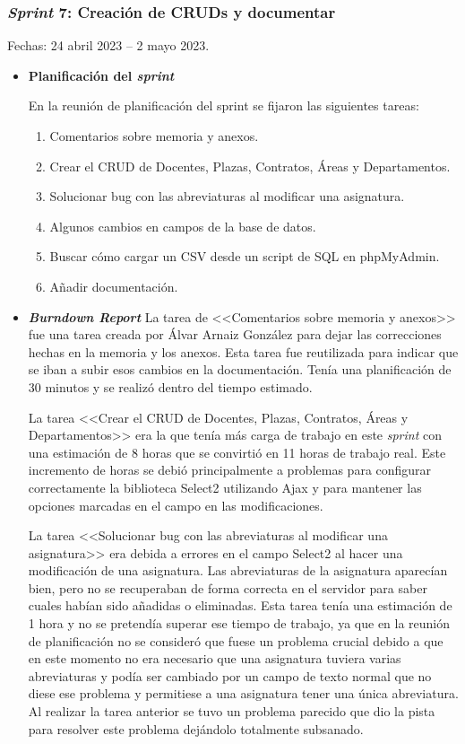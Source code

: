 \subsubsection{\textit{Sprint} 7: Creación de CRUDs y documentar}
Fechas: 24 abril 2023 -- 2 mayo 2023.
\begin{itemize}
\item\textbf{Planificación del \textit{sprint}}


En la reunión de planificación del sprint se fijaron las siguientes tareas:
\begin{enumerate}
		\item Comentarios sobre memoria y anexos.
		\item Crear el CRUD de Docentes, Plazas, Contratos, Áreas y Departamentos.
		\item Solucionar bug con las abreviaturas al modificar una asignatura.
		\item Algunos cambios en campos de la base de datos.
		\item Buscar cómo cargar un CSV desde un script de SQL en phpMyAdmin.
		\item Añadir documentación.
\end{enumerate}

\item\textbf{\textit{Burndown Report}}
La tarea de <<Comentarios sobre memoria y anexos>> fue una tarea creada por Álvar Arnaiz González para dejar las correcciones hechas en la memoria y los anexos. 
Esta tarea fue reutilizada para indicar que se iban a subir esos cambios en la documentación. 
Tenía una planificación de 30 minutos y se realizó dentro del tiempo estimado.

La tarea <<Crear el CRUD de Docentes, Plazas, Contratos, Áreas y Departamentos>> era la que tenía más carga de trabajo en este \textit{sprint} con una estimación de 8 horas que se convirtió en 11 horas de trabajo real.
Este incremento de horas se debió principalmente a problemas para configurar correctamente la biblioteca Select2 utilizando Ajax y para mantener las opciones marcadas en el campo en las modificaciones.

La tarea <<Solucionar bug con las abreviaturas al modificar una asignatura>> era debida a errores en el campo Select2 al hacer una modificación de una asignatura. 
Las abreviaturas de la asignatura aparecían bien, pero no se recuperaban de forma correcta en el servidor para saber cuales habían sido añadidas o eliminadas.
Esta tarea tenía una estimación de 1 hora y no se pretendía superar ese tiempo de trabajo, ya que en la reunión de planificación no se consideró que fuese un problema crucial debido a que en este momento no era necesario que una asignatura tuviera varias abreviaturas y podía ser cambiado por un campo de texto normal que no diese ese problema y permitiese a una asignatura tener una única abreviatura.
Al realizar la tarea anterior se tuvo un problema parecido que dio la pista para resolver este problema dejándolo totalmente subsanado.


\end{itemize}
